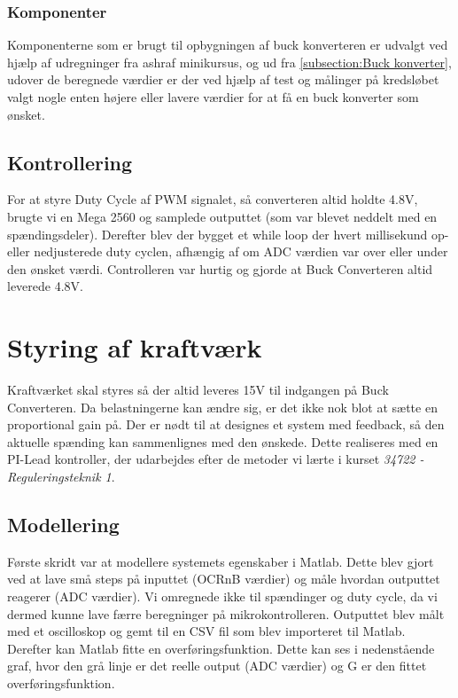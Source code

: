 \documentclass[../main.tex]{subfiles}
\begin{document}
\subsubsection{Komponenter}
Komponenterne som er brugt til opbygningen af buck konverteren er udvalgt ved hjælp af udregninger fra ashraf minikursus, og ud fra \ref{subsection:Buck konverter}, udover de beregnede værdier er der ved hjælp af test og målinger på kredsløbet valgt nogle enten højere eller lavere værdier for at få en buck konverter som ønsket.


\subsection{Kontrollering}
For at styre Duty Cycle af PWM signalet, så converteren altid holdte 4.8V, brugte vi en Mega 2560 og samplede outputtet (som var blevet neddelt med en spændingsdeler). Derefter blev der bygget et while loop der hvert millisekund op- eller nedjusterede duty cyclen, afhængig af om ADC værdien var over eller under den ønsket værdi. Controlleren var hurtig og gjorde at Buck Converteren altid leverede 4.8V. 

\section{Styring af kraftværk}
Kraftværket skal styres så der altid leveres 15V til indgangen på Buck Converteren. Da belastningerne kan ændre sig, er det ikke nok blot at sætte en proportional gain på. Der er nødt til at designes et system med feedback, så den aktuelle spænding kan sammenlignes med den ønskede. Dette realiseres med en PI-Lead kontroller, der udarbejdes efter de metoder vi lærte i kurset \emph{34722 - Reguleringsteknik 1}.

\subsection{Modellering}
Første skridt var at modellere systemets egenskaber i Matlab. Dette blev gjort ved at lave små steps på inputtet (OCRnB værdier) og måle hvordan outputtet reagerer (ADC værdier). Vi omregnede ikke til spændinger og duty cycle, da vi dermed kunne lave færre beregninger på mikrokontrolleren. Outputtet blev målt med et oscilloskop og gemt til en CSV fil som blev importeret til Matlab. Derefter kan Matlab fitte en overføringsfunktion. Dette kan ses i nedenstående graf, hvor den grå linje er det reelle output (ADC værdier) og G er den fittet overføringsfunktion. 
\end{document}
